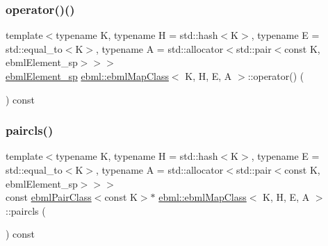 \mbox{\label{classebml_1_1ebmlMapClass_a189fe07c7ef4e9cbe9b7bc39746a5a18}} 
\subsubsection{\texorpdfstring{operator()()}{operator()()}\hspace{0.1cm}{\footnotesize\ttfamily [12/12]}}
{\footnotesize\ttfamily template$<$typename K, typename H = std\+::hash$<$\+K$>$, typename E = std\+::equal\+\_\+to$<$\+K$>$, typename A = std\+::allocator$<$std\+::pair$<$const K, ebml\+Element\+\_\+sp$>$$>$$>$ \\
\mbox{\hyperlink{namespaceebml_adad533b7705a16bb360fe56380c5e7be}{ebml\+Element\+\_\+sp}} \mbox{\hyperlink{classebml_1_1ebmlMapClass}{ebml\+::ebml\+Map\+Class}}$<$ K, H, E, A $>$\+::operator() (\begin{DoxyParamCaption}\item[{std\+::unordered\+\_\+map$<$ K, \mbox{\hyperlink{namespaceebml_adad533b7705a16bb360fe56380c5e7be}{ebml\+Element\+\_\+sp}}, H, E, A $>$ \&\&}]{ }\end{DoxyParamCaption}) const}

\mbox{\label{classebml_1_1ebmlMapClass_ad38f9bbe85f05f8865e9df739ab34792}} 
\subsubsection{\texorpdfstring{paircls()}{paircls()}}
{\footnotesize\ttfamily template$<$typename K, typename H = std\+::hash$<$\+K$>$, typename E = std\+::equal\+\_\+to$<$\+K$>$, typename A = std\+::allocator$<$std\+::pair$<$const K, ebml\+Element\+\_\+sp$>$$>$$>$ \\
const \mbox{\hyperlink{classebml_1_1ebmlPairClass}{ebml\+Pair\+Class}}$<$const K$>$$\ast$ \mbox{\hyperlink{classebml_1_1ebmlMapClass}{ebml\+::ebml\+Map\+Class}}$<$ K, H, E, A $>$\+::paircls (\begin{DoxyParamCaption}{ }\end{DoxyParamCaption}) const}



